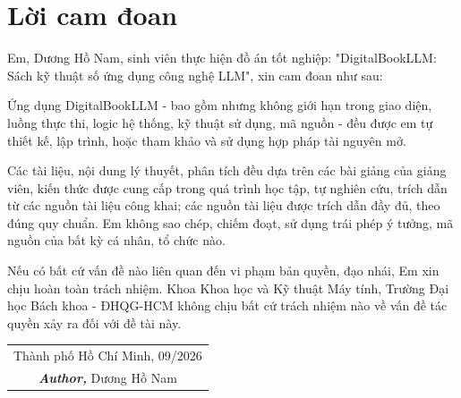 \chapter*{Lời cam đoan}

Em, Dương Hồ Nam, sinh viên thực hiện đồ án tốt nghiệp: "DigitalBookLLM: Sách kỹ thuật số ứng dụng công nghệ LLM", xin cam đoan như sau:

\noindent Ứng dụng DigitalBookLLM - bao gồm nhưng không giới hạn trong giao diện, luồng thực thi, logic hệ thống, kỹ thuật sử dụng, mã nguồn - đều được em tự thiết kế, lập trình, hoặc tham khảo và sử dụng hợp pháp tài nguyên mở. 

\noindent Các tài liệu, nội dung lý thuyết, phân tích đều dựa trên các bài giảng của giảng viên, kiến thức được cung cấp trong quá trình học tập, tự nghiên cứu, trích dẫn từ các nguồn tài liệu công khai; các nguồn tài liệu được trích dẫn đầy đủ, theo đúng quy chuẩn. Em không sao chép, chiếm đoạt, sử dụng trái phép ý tưởng, mã nguồn của bất kỳ cá nhân, tổ chức nào.
 
\noindent Nếu có bất cứ vấn đề nào liên quan đến vi phạm bản quyền, đạo nhái, Em xin chịu hoàn toàn trách nhiệm. Khoa Khoa học và Kỹ thuật Máy tính, Trường Đại học Bách khoa - ĐHQG-HCM không chịu bất cứ trách nhiệm nào về vấn đề tác quyền xảy ra đối với đề tài này.

\vspace{2cm}

\begin{flushright}
\begin{tabular}{c}
    Thành phố Hồ Chí Minh, 09/2026 \\
    \textit{\textbf{Author,}} 
    Dương Hồ Nam
\end{tabular}
\end{flushright}